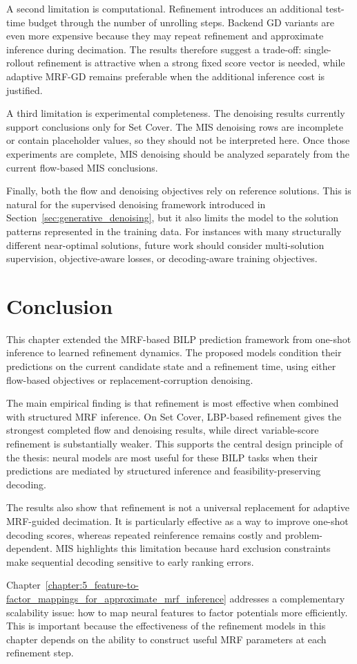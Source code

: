 A second limitation is computational. Refinement introduces an additional test-time budget through the number of unrolling steps. Backend GD variants are even more expensive because they may repeat refinement and approximate inference during decimation. The results therefore suggest a trade-off: single-rollout refinement is attractive when a strong fixed score vector is needed, while adaptive MRF-GD remains preferable when the additional inference cost is justified.

A third limitation is experimental completeness. The denoising results currently support conclusions only for Set Cover. The MIS denoising rows are incomplete or contain placeholder values, so they should not be interpreted here. Once those experiments are complete, MIS denoising should be analyzed separately from the current flow-based MIS conclusions.

Finally, both the flow and denoising objectives rely on reference solutions. This is natural for the supervised denoising framework introduced in Section~\ref{sec:generative_denoising}, but it also limits the model to the solution patterns represented in the training data. For instances with many structurally different near-optimal solutions, future work should consider multi-solution supervision, objective-aware losses, or decoding-aware training objectives.

\section{Conclusion}
\label{sec:chapter_4_conclusion}

This chapter extended the MRF-based BILP prediction framework from one-shot inference to learned refinement dynamics. The proposed models condition their predictions on the current candidate state and a refinement time, using either flow-based objectives or replacement-corruption denoising.

The main empirical finding is that refinement is most effective when combined with structured MRF inference. On Set Cover, LBP-based refinement gives the strongest completed flow and denoising results, while direct variable-score refinement is substantially weaker. This supports the central design principle of the thesis: neural models are most useful for these BILP tasks when their predictions are mediated by structured inference and feasibility-preserving decoding.

The results also show that refinement is not a universal replacement for adaptive MRF-guided decimation. It is particularly effective as a way to improve one-shot decoding scores, whereas repeated reinference remains costly and problem-dependent. MIS highlights this limitation because hard exclusion constraints make sequential decoding sensitive to early ranking errors.

Chapter~\ref{chapter:5_feature-to-factor_mappings_for_approximate_mrf_inference} addresses a complementary scalability issue: how to map neural features to factor potentials more efficiently. This is important because the effectiveness of the refinement models in this chapter depends on the ability to construct useful MRF parameters at each refinement step.